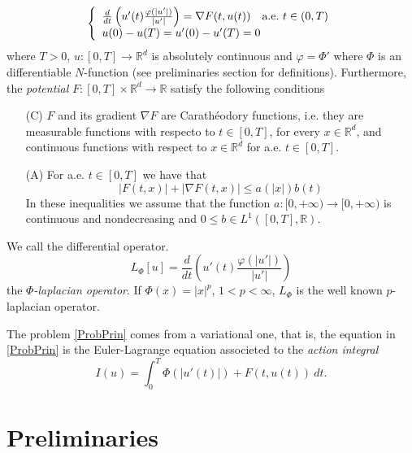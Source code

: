 \documentclass[twoside]{article}
\theoremstyle{remark}
\newcommand{\rr}{\mathbb{R}}
\renewcommand{\leq}{\leqslant}
\begin{document}
\begin{equation}\label{ProbPrin}
    \left\{%
\begin{array}{ll}
   \frac{d}{dt}\left(u'(t)\frac{\varphi(|u'|)}{|u'|}\right) = \nabla F(t,u(t)) \quad \hbox{a.e.}\ t \in (0,T)\\
    u(0)-u(T)=u'(0)-u'(T)=0
\end{array}%
\right.
\end{equation}
where $T>0$, $u:[0,T]\to\rr^d$ is absolutely continuous and  $\varphi=\Phi'$ where $\Phi$ is an differentiable  $N$-function (see preliminaries section  for definitions). Furthermore, the \emph{potential} $F:[0,T]\times\rr^d\to\rr$  satisfy the following conditions
\begin{enumerate}

 \item[(C)] $F$ and its gradient $\nabla F$ are  Carath\'eodory functions, i.e. they are measurable functions with respecto to $t\in [0,T]$, for every  $x\in\rr^d$, and   continuous functions with  respect to  $x\in\rr^d$ for a.e. $t \in [0,T]$.

 \item[(A)]   For   a.e. $t\in [0,T]$ we have that
\begin{equation}
|F(t,x)| + |\nabla F(t,x)|  \leq a(|x|)b(t)
\end{equation}
In these inequalities we assume that the function  $a:[0,+\infty)\to [0,+\infty)$ is continuous and nondecreasing and $0\leq b\in L^1([0,T],\rr)$.


\end{enumerate}

We call the differential operator.
\[L_{\Phi}[u]=\frac{d}{dt}\left(u'(t)\frac{\varphi(|u'|)}{|u'|}\right) \]
the
\emph{$\Phi$-laplacian operator}. If $\Phi(x)=|x|^p$, $1<p<\infty$, $L_{\Phi}$ is the well known $p$-laplacian operator.



The problem \eqref{ProbPrin} comes from a variational one, that is,  the equation in  \eqref{ProbPrin}  is the Euler-Lagrange equation associeted to the \emph{action integral}
\begin{equation}\label{integral_accion}
I(u)=\int_{0}^T \Phi(|u'(t)|)+F(t,u(t))\ dt.
\end{equation}




\section{Preliminaries}\label{preliminares}
\end{document}
